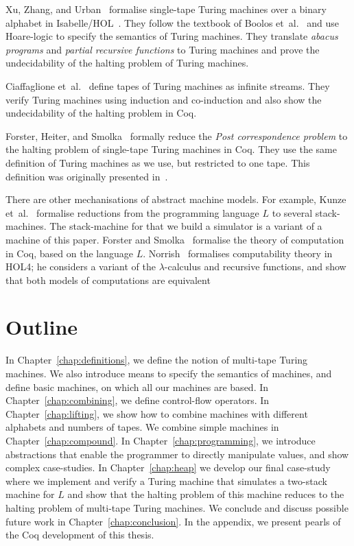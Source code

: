 Xu, Zhang, and Urban~\cite{Xu:2013:MTM:2529315.2529331} formalise single-tape Turing machines over a binary alphabet in
Isabelle/HOL~\cite{nipkow2002isabelle}.  They follow the textbook of Boolos et~al.~\cite{boolos2007computability} and use Hoare-logic to specify the
semantics of Turing machines.  They translate \textit{abacus programs} and \textit{partial recursive functions} to Turing machines and prove the
undecidability of the halting problem of Turing machines.

Ciaffaglione et~al.~\cite{Ciaffaglione:2016:TTC:2956213.2956306} define tapes of Turing machines as infinite streams.  They verify Turing machines
using induction and co-induction and also show the undecidability of the halting problem in Coq.

Forster, Heiter, and Smolka~\cite{PCPITP} formally reduce the \textit{Post correspondence problem} to the halting problem of single-tape Turing
machines in Coq.  They use the same definition of Turing machines as we use, but restricted to one tape.  This definition was originally presented
in~\cite{asperti2012}.

There are other mechanisations of abstract machine models.  For example, Kunze et~al.~\cite{KunzeEtAl:2018:Formal} formalise reductions from the
programming language $L$ to several stack-machines.  The stack-machine for that we build a simulator is a variant of a machine of this paper.  Forster
and Smolka~\cite{ForsterSmolka17} formalise the theory of computation in Coq, based on the language $L$.  Norrish~\cite{NorrishComputabilityTheory}
formalises computability theory in HOL4; he considers a variant of the $\lambda$-calculus and recursive functions, and show that both models of
computations are equivalent



\section{Outline}
\label{sec:outline}

In Chapter~\ref{chap:definitions}, we define the notion of multi-tape Turing machines.  We also introduce means to specify the semantics of machines,
and define basic machines, on which all our machines are based.  In Chapter~\ref{chap:combining}, we define control-flow operators.  In
Chapter~\ref{chap:lifting}, we show how to combine machines with different alphabets and numbers of tapes.  We combine simple machines in
Chapter~\ref{chap:compound}.  In Chapter~\ref{chap:programming}, we introduce abstractions that enable the programmer to directly manipulate values,
and show complex case-studies.  In Chapter~\ref{chap:heap} we develop our final case-study where we implement and verify a Turing machine that
simulates a two-stack machine for $L$ and show that the halting problem of this machine reduces to the halting problem of multi-tape Turing machines.
We conclude and discuss possible future work in Chapter~\ref{chap:conclusion}.  In the appendix, we present pearls of the Coq development of this
thesis.

